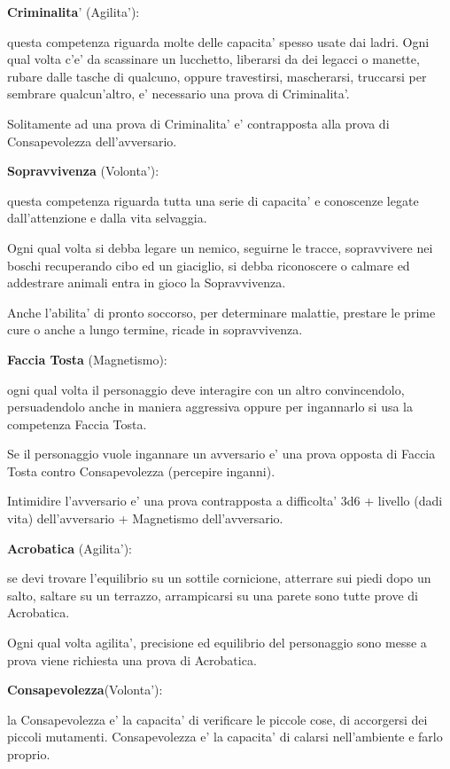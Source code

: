 \documentclass[a4paper,11pt,twoside,openany]{book}
\begin{document}
	\textbf{Criminalita}' (Agilita'):
	
	questa competenza riguarda molte delle capacita' spesso usate dai ladri. Ogni qual volta c'e' da scassinare un lucchetto, liberarsi da dei legacci o manette, rubare dalle tasche di qualcuno, oppure travestirsi, mascherarsi, truccarsi per sembrare qualcun'altro, e' necessario una prova di Criminalita'.
	
	Solitamente ad una prova di Criminalita' e' contrapposta alla prova di Consapevolezza dell'avversario.
	
	\textbf{Sopravvivenza} (Volonta'):
	
	questa competenza riguarda tutta una serie di capacita' e conoscenze legate dall'attenzione e dalla vita selvaggia.
	
	Ogni qual volta si debba legare un nemico, seguirne le tracce, sopravvivere nei boschi recuperando cibo ed un giaciglio,  si debba riconoscere o calmare ed addestrare animali entra in gioco la Sopravvivenza.
	
	Anche l'abilita' di pronto soccorso, per determinare malattie, prestare le prime cure o anche a lungo termine, ricade in sopravvivenza.
	
	\textbf{Faccia Tosta} (Magnetismo):
	
	ogni qual volta il personaggio deve interagire con un altro convincendolo, persuadendolo anche in maniera aggressiva oppure per ingannarlo si usa la competenza Faccia Tosta.
	
	Se il personaggio vuole ingannare un avversario e' una prova opposta di Faccia Tosta contro Consapevolezza (percepire inganni).
	
	Intimidire l'avversario e' una prova contrapposta a difficolta' 3d6 + livello (dadi vita) dell'avversario + Magnetismo dell'avversario.
	
	\textbf{Acrobatica} (Agilita'):
	
	se devi trovare l'equilibrio su un sottile cornicione, atterrare sui piedi dopo un salto, saltare su un terrazzo, arrampicarsi su una parete sono tutte prove di Acrobatica.
	
	Ogni qual volta agilita', precisione ed equilibrio del personaggio sono messe a prova viene richiesta una prova di Acrobatica.
	
	\textbf{Consapevolezza}(Volonta'):
	
	la Consapevolezza e' la capacita' di verificare le piccole cose, di accorgersi dei piccoli mutamenti. Consapevolezza e' la capacita' di calarsi nell'ambiente e farlo proprio.
	
\end{document}
